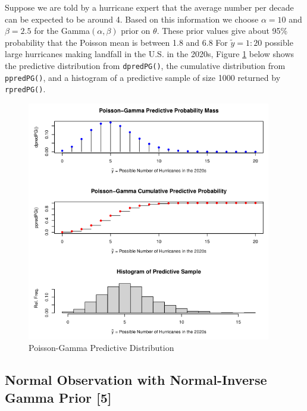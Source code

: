 \documentclass[12pt, a4paper]{article}
\begin{document}
Suppose we are told by a hurricane expert that the average number per decade can be expected to be around 4.  Based on this information we choose $\alpha = 10$ and $\beta = 2.5$ for the Gamma$(\alpha,\beta)$ prior on $\theta$.  These prior values give about 95\% probability that the Poisson mean is between 1.8 and 6.8  For $\tilde{y} = 1:20$ possible large hurricanes making landfall in the U.S. in the 2020s, Figure \ref{fig:PGdist} below shows the predictive distribution from \texttt{dpredPG()}, the cumulative distribution from \texttt{ppredPG()}, and a histogram of a predictive sample of size 1000 returned by \texttt{rpredPG()}.

\begin{figure}[ht]
  \centering
  \includegraphics[width=0.95\textwidth]{./Graphics/DistributionPlots/PoissonGamma}
  \caption{Poisson-Gamma Predictive Distribution}
  \label{fig:PGdist}
\end{figure}

\vspace{2cm}





\clearpage

  \subsection{Normal Observation with Normal-Inverse Gamma Prior [5]}
\end{document}
